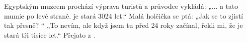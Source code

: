 \begin{mdframed}[style=mdexam]
  \begin{example}\label{mai:exam103}
    Egyptským muzeem prochází výprava turistů a průvodce vykládá:\newline
    „... a tato mumie po levé straně. je stará \num{3024} let.“ Malá holčička se ptá: „Jak se to
    zjistí tak přesně? “ „To nevím, ale když jsem tu před 24 roky začínal, řekli mi, že je stará
    tři tisíce let.“ Přejato z \cite[s.~10]{Rogalewicz2007}.
  \end{example}
\end{mdframed}